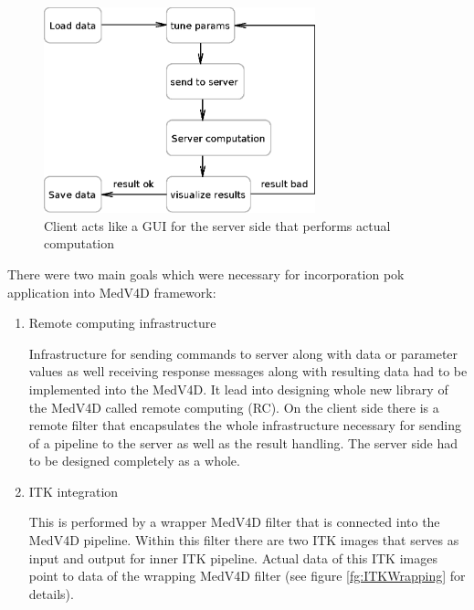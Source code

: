 \begin{figure}
    \centering
    \includegraphics[width=0.7\textwidth]{data/computationProcess}
    \caption[LevelSetClient application computation process]{Client acts like a GUI for the server side that performs actual computation}
    \label{fg:computationProcess}
\end{figure}

\par
There were two main goals which were necessary for incorporation pok application into MedV4D framework:
\begin{enumerate}

  \item{Remote computing infrastructure}
  \par
  Infrastructure for sending commands to server along with data or parameter values as well receiving response messages along with resulting data had to be implemented into the MedV4D.
It lead into designing whole new library of the MedV4D called remote computing (RC).
On the client side there is a remote filter that encapsulates the whole infrastructure necessary for sending of a pipeline to the server as well as the result handling.
The server side had to be designed completely as a whole.

  \item{ITK integration}
  \par
  This is performed by a wrapper MedV4D filter that is connected into the MedV4D pipeline.
Within this filter there are two ITK images that serves as input and output for inner ITK pipeline.
Actual data of this ITK images point to data of the wrapping MedV4D filter (see figure \ref{fg:ITKWrapping} for details).

\end{enumerate}

